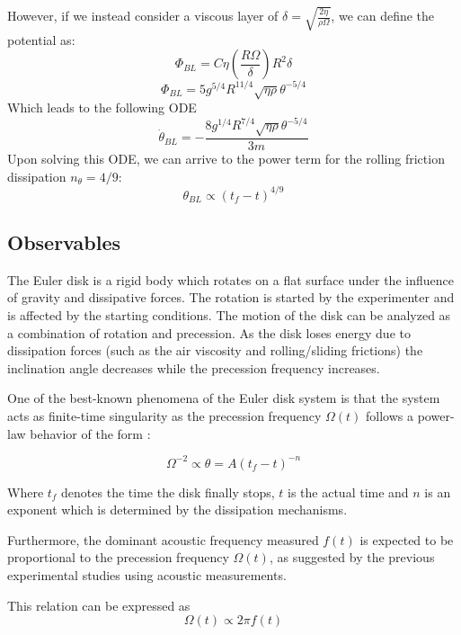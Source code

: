 However, if we instead consider a viscous layer of $\delta=\sqrt{\frac{2\eta}{\rho\Omega}}$, we can define the potential as:
\begin{equation}
    \Phi_{BL}=C\eta\left( \frac{R\Omega}{\delta} \right) R^2\delta
\end{equation}
\begin{equation}
    \Phi_{BL}=5g^{5/4}R^{11/4}\sqrt{\eta\rho}\theta^{-5/4}
\end{equation}
Which leads to the following ODE
\begin{equation}
    \dot\theta_{BL}=-\frac{8g^{1/4}R^{7/4}\sqrt{\eta\rho}\theta^{-5/4}}{3m}
\end{equation}
Upon solving this ODE, we can arrive to the power term for the rolling friction dissipation $n_{\theta}=4/9$:
\begin{equation}
    \theta_{BL}\propto(t_f-t)^{4/9}
\end{equation}

\subsection{Observables}
The Euler disk is a rigid body which rotates on a flat surface under the influence of gravity and dissipative forces. The rotation is started by the experimenter and is affected by the starting conditions. The motion of the disk can be analyzed as a combination of rotation and precession. As the disk loses energy due to dissipation forces (such as the air viscosity and rolling/sliding frictions) the inclination angle decreases while the precession frequency increases.

One of the best-known phenomena of the Euler disk system is that the system acts as finite-time singularity as the precession frequency $\Omega(t)$ follows a power-law behavior of the form \cite{Darmendrail2021}:

\begin{equation}
    \Omega^{-2} \propto \theta=A(t_f - t)^{-n}
\end{equation}

Where $t_f$ denotes the time the disk finally stops, $t$ is the actual time and $n$ is an exponent which is determined by the dissipation mechanisms.

Furthermore, the dominant acoustic frequency measured $f(t)$ is expected to be proportional to the precession frequency $\Omega(t)$, as suggested by the previous experimental studies using acoustic measurements.

This relation can be expressed as
\begin{equation}
    \Omega(t) \propto 2\pi f(t) 
\end{equation}



